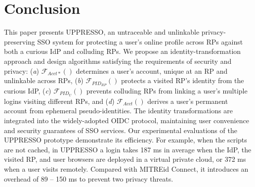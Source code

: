 \section{Conclusion}
\label{sec:conclusion}
This paper presents UPPRESSO, an untraceable and unlinkable privacy-preserving SSO system for protecting a user's online profile across RPs against both a curious IdP and colluding RPs.
We propose an identity-transformation approach and design algorithms satisfying the requirements of security and privacy: (\emph{a}) $\mathcal{F}_{Acct\ast}()$ determines a user's account, unique at an RP and unlinkable across RPs,
(\emph{b}) $\mathcal{F}_{PID_{RP}}()$ protects a visited RP's identity from the curious IdP, (\emph{c}) $\mathcal{F}_{PID_{U}}()$ prevents colluding RPs from linking a user's multiple logins visiting different RPs, and (\emph{d}) $\mathcal{F}_{Acct}()$ derives a user's permanent account from ephemeral pseudo-identities.
The identity transformations are integrated into the widely-adopted OIDC protocol, maintaining user convenience and security guarantees of SSO services. Our experimental evaluations of the UPPRESSO prototype demonstrate its efficiency.
For example,
            when the scripts are not cached,
in UPPRESSO a login takes 187 ms in average when the IdP, the visited RP, and user browsers are deployed in a virtual private cloud, or 372 ms when a user visits remotely.
Compared with MITREid Connect,
it introduces an overhead of 89 -- 150 ms to prevent two privacy threats.



\newpage 
